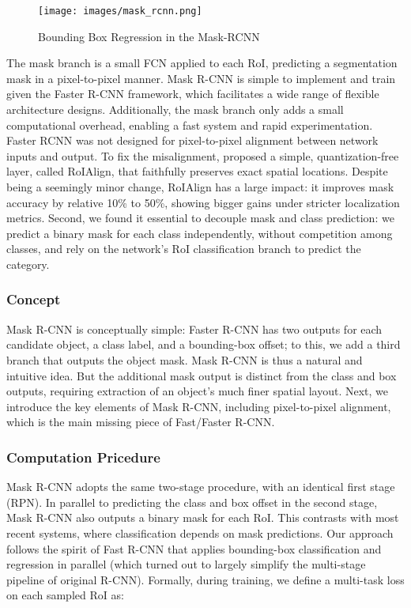 \documentclass[a4paper, openany]{book}
\begin{document}
\begin{figure}[ht]
  \centering
    \texttt{[image: images/mask\_rcnn.png]}
      \caption{Bounding Box Regression in the Mask-RCNN}
  \label{fig:mask-rcnn}
\end{figure}

The mask branch is a small FCN applied to each RoI, predicting a segmentation mask in a pixel-to-pixel manner. Mask R-CNN is simple to implement and train given the Faster R-CNN framework, which facilitates a wide range of flexible architecture designs. Additionally, the mask branch only adds a small computational overhead, enabling a fast system and rapid experimentation. Faster RCNN was not designed for pixel-to-pixel alignment between network inputs and output. 
To fix the misalignment, proposed a simple, quantization-free layer, called RoIAlign, that faithfully preserves exact spatial locations. Despite being a seemingly minor change, RoIAlign has a large impact: it improves mask accuracy by relative 10\% to 50\%, showing bigger gains under stricter localization metrics. Second, we found it essential to decouple mask and class prediction: we predict a binary mask for each class independently, without competition among classes, and rely on the network’s RoI classification branch to predict the category. 

\subsubsection{Concept}
	\vspace{0.3cm}
Mask R-CNN is conceptually simple: Faster R-CNN has two outputs for each candidate object, a class label, and a bounding-box offset; to this, we add a third branch that outputs the object mask. Mask R-CNN is thus a natural and intuitive idea. But the additional mask output is distinct from the class and box outputs, requiring extraction of an object's much finer spatial layout. Next, we introduce the key elements of Mask R-CNN, including pixel-to-pixel alignment, which is the main missing piece of Fast/Faster R-CNN.
\newpage

\subsubsection{Computation Pricedure}
	\vspace{0.3cm}
	
Mask R-CNN adopts the same two-stage procedure, with an identical first stage (RPN). In parallel to predicting the class and box offset in the second stage, Mask R-CNN also outputs a binary mask for each RoI. This contrasts with most recent systems, where classification depends on mask predictions. Our approach follows the spirit of Fast R-CNN that applies bounding-box classification and regression in parallel (which turned out to largely simplify the multi-stage pipeline of original R-CNN). Formally, during training, we define a multi-task loss on each sampled RoI as:
\end{document}
